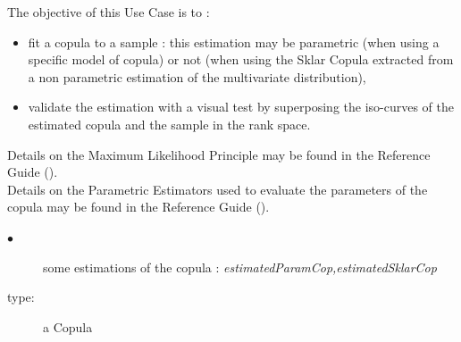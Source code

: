 \renewcommand{\filename}{docUC_InputNoData_CopulaEstimation.tex}
\renewcommand{\filetitle}{UC : Estimation of a Copula from a sample}

\HeaderIIILevel


\label{copula_estimation}





The objective of this Use Case is to :
\begin{itemize}
\item fit a copula to a sample : this estimation may be parametric (when using a specific model of copula) or not (when using the Sklar Copula extracted from a non parametric estimation of the multivariate distribution),
\item validate the estimation with a visual test by superposing the iso-curves of the estimated copula and the sample in the rank space.
\end{itemize}


Details on the Maximum Likelihood  Principle may be found in the Reference Guide ().\\

Details on the Parametric Estimators used to evaluate the parameters of the copula may be found in the Reference Guide ().\\



             {
               \begin{description}
               \item[$\bullet$] some estimations of the copula : {\itshape estimatedParamCop,estimatedSklarCop }
               \item[type:] a Copula
               \end{description}
             }


